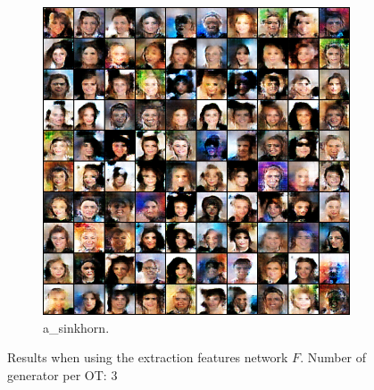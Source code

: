 \begin{figure}[!htbp]
   \centering
\begin{subfigure}[t]{0.98\textwidth}
   \includegraphics[width=\textwidth,max height=1.00\textheight,center]{2019-04-30/celeba/learn-cost/a_sinkhorn.png}
   \caption{a_sinkhorn.}
   \label{fig:.._.._notes_journal_figures_2019-04-30_celeba_learn-cost-a}
\end{subfigure}
   \caption{Results when using the extraction features network $F$. Number of generator per OT: 3}
   \label{fig:2019-04-30_celeba_learn-cost}
\end{figure}